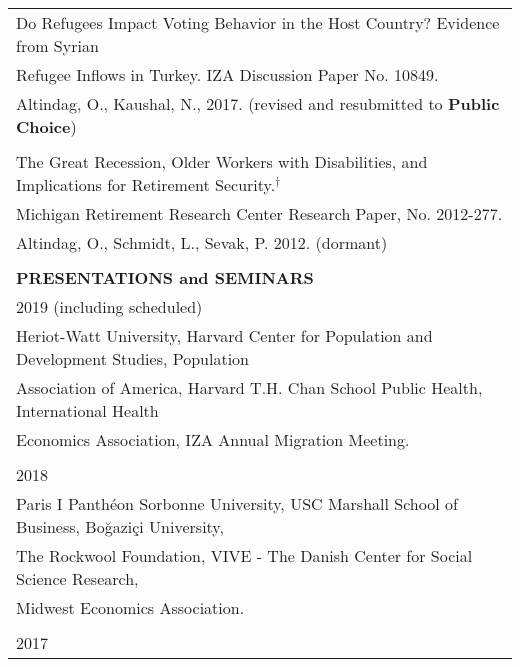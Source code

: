 \documentclass[12 pt]{article}
\begin{document}
\begin{longtable}{ccccc}
\\

  \multicolumn{5}{l}{Do Refugees Impact Voting Behavior in the Host Country? Evidence from Syrian } \\
    \multicolumn{5}{l}{Refugee Inflows in Turkey. IZA Discussion Paper No. 10849.} \\
 \multicolumn{5}{l}{Altindag, O., Kaushal, N., 2017. (revised and resubmitted to \textbf{Public Choice})} \\
\\




\multicolumn{5}{l}{The Great Recession, Older Workers with Disabilities, and Implications for Retirement Security.$^{\dagger}$} \\
\multicolumn{5}{l}{Michigan Retirement Research Center Research Paper, No. 2012-277.} \\
\multicolumn{5}{l}{Altindag, O., Schmidt, L., Sevak, P. 2012. (dormant) } \\
\\


 
 

 \multicolumn{5}{l}{\textbf{PRESENTATIONS and SEMINARS}}\\[2 pt]
 

  \multicolumn{5}{l}{2019 (including scheduled)}\\
   \multicolumn{5}{l}{Heriot-Watt University, Harvard Center for Population and Development Studies, Population} \\
 \multicolumn{5}{l}{Association of America, Harvard T.H. Chan School Public Health, International Health} \\
  \multicolumn{5}{l}{Economics Association, IZA Annual Migration Meeting.} \\

 \\ 
  \multicolumn{5}{l}{2018}\\
     \multicolumn{5}{l}{Paris I Panth\'{e}on Sorbonne University,  USC Marshall School of Business, Bo\u{g}azi\c{c}i University,} \\
   \multicolumn{5}{l}{The Rockwool Foundation, VIVE - The Danish Center for Social Science Research,} \\
      \multicolumn{5}{l}{Midwest Economics Association.} \\
\\
  \multicolumn{5}{l}{2017}\\


\end{longtable}
\end{document}
